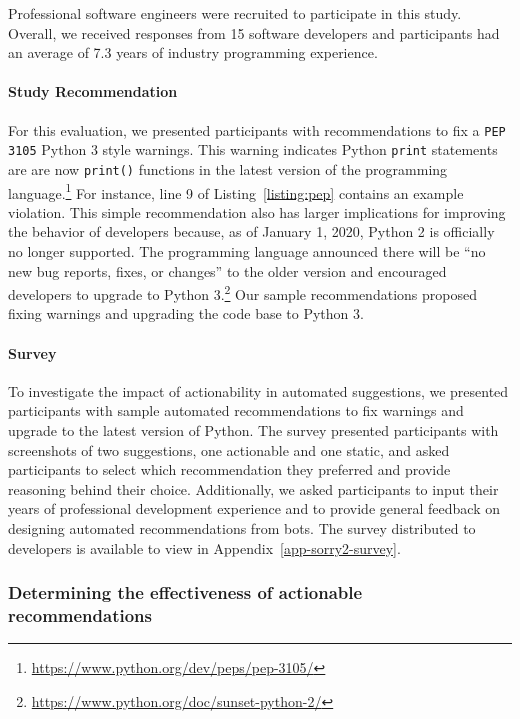 Professional software engineers were recruited to participate in this study. Overall, we received responses from 15 software developers and participants had an average of 7.3 years of industry programming experience. 

\paragraph*{Study Recommendation}

For this evaluation, we presented participants with recommendations to fix a \texttt{PEP 3105} Python 3 style warnings. This warning indicates Python \texttt{print} statements are are now \texttt{print()} functions in the latest version of the programming language.\footnote{\url{https://www.python.org/dev/peps/pep-3105/}} For instance, line 9 of Listing~\ref{listing:pep} contains an example \PEP violation. This simple recommendation also has larger implications for improving the behavior of developers because, as of January 1, 2020, Python 2 is officially no longer supported. The programming language announced there will be ``no new bug reports, fixes, or changes'' to the older version and encouraged developers to upgrade to Python 3.\footnote{\url{https://www.python.org/doc/sunset-python-2/}} Our sample recommendations proposed fixing \PEP warnings and upgrading the code base to Python 3.

\paragraph*{Survey}

To investigate the impact of actionability in automated suggestions, we presented participants with sample automated recommendations to fix \PEP warnings and upgrade to the latest version of Python. The survey presented participants with screenshots of two suggestions, one actionable and one static, and asked participants to select which recommendation they preferred and provide reasoning behind their choice. Additionally, we asked participants to input their years of professional development experience and to provide general feedback on designing automated recommendations from bots. The survey distributed to developers is available to view in Appendix~\ref{app-sorry2-survey}.



\subsubsection{Determining the effectiveness of actionable recommendations}

